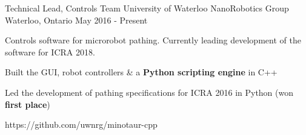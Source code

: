 \begin{cventries}
\cventrylink
{Technical Lead, Controls Team}
{University of Waterloo NanoRobotics Group}
{Waterloo, Ontario}
{May 2016 - Present} %
{ %
Controls software for microrobot pathing. Currently leading development of the software for ICRA 2018.
\begin{cvitems}
\item[]
\item {Built the GUI, robot controllers \& a \textbf{Python scripting engine} in C++}
\item {Led the development of pathing specifications for ICRA 2016 in Python (won \textbf{first place})}
\end{cvitems}
}
{https://github.com/uwnrg/minotaur-cpp}

\end{cventries}
